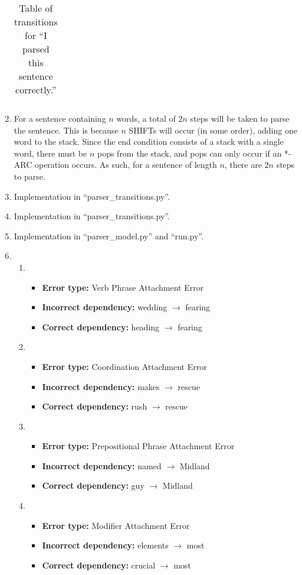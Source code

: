 \documentclass[12pt]{article}
\begin{document}
\begin{enumerate}[label=(\alph*)]
\begin{table}[h!]
\begin{tabular}{l|l|l|l}
      \end{tabular}
      \caption{Table of transitions for ``I parsed this sentence correctly.''}
      \label{table:parsing}
    \end{table}
  \item For a sentence containing $n$ words, a total of $2n$ steps will be taken to parse the sentence. This is because $n$ SHIFTs will occur (in some order), adding one word to the stack. Since the end condition consists of a stack with a single word, there must be $n$ pops from the stack, and pops can only occur if an *-ARC operation occurs. As such, for a sentence of length $n$, there are $2n$ steps to parse.
  \item Implementation in ``parser\_transitions.py''.
  \item Implementation in ``parser\_transitions.py''.
  \item Implementation in ``parser\_model.py'' and ``run.py''.
  \item 
    \begin{enumerate}[label=\roman*]
      \item 
        \begin{itemize}
          \item \textbf{Error type:} Verb Phrase Attachment Error
          \item \textbf{Incorrect dependency:} wedding $\rightarrow$ fearing
          \item \textbf{Correct dependency:} heading $\rightarrow$ fearing
        \end{itemize}
      \item
        \begin{itemize}
          \item \textbf{Error type:} Coordination Attachment Error
          \item \textbf{Incorrect dependency:} makes $\rightarrow$ rescue
          \item \textbf{Correct dependency:} rush $\rightarrow$ rescue
        \end{itemize}
      \item
        \begin{itemize}
          \item \textbf{Error type:} Prepositional Phrase Attachment Error
          \item \textbf{Incorrect dependency:}  named $\rightarrow$ Midland
          \item \textbf{Correct dependency:}  guy $\rightarrow$ Midland
        \end{itemize}
      \item 
        \begin{itemize}
          \item \textbf{Error type:} Modifier Attachment Error
          \item \textbf{Incorrect dependency:} elements $\rightarrow$ most
          \item \textbf{Correct dependency:} crucial $\rightarrow$ most
        \end{itemize}
    \end{enumerate}
\end{enumerate}
\end{document}
